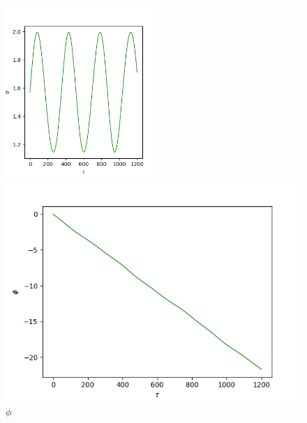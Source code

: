 \documentclass[10pt,a4paper]{report}
\begin{document}
\begin{figure}[!ht]
\begin{minipage}[b]{0.5\linewidth}
\centering
\includegraphics[width=\textwidth, height=6.5cm]{3a/theta.png}
\caption{$\theta$}
\label{fig:figure1}
\end{minipage}
\hspace{0.5cm}
\begin{minipage}[b]{0.5\linewidth}
\centering
\includegraphics[width=\textwidth]{3a/phi.png}
\caption{$\phi$}
\label{fig:figure2}
\end{minipage}
\end{figure}
\end{document}
